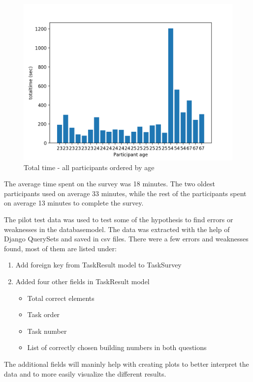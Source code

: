 \begin{figure}[h]
	\centering
	\includegraphics[width=0.8\linewidth]{fig/allParticipants_sorted_Age_Participant_exclude4_labelage}
	\caption[totaltimeage]{Total time - all participants ordered by age}
	\label{fig:allparticipantssortedageparticipantexclude4labelage}
\end{figure}

The average time spent on the survey was 18 minutes. The two oldest participants used on average 33 minutes, while the rest of the participants spent on average 13 minutes to complete the survey. 

The pilot test data was used to test some of the hypothesis to find errors or weaknesses in the databasemodel. The data was extracted with the help of Django QuerySets and saved in csv files. There were a few errors and weaknesses found, most of them are listed under: 

\begin{enumerate}
	\item Add foreign key from TaskResult model to TaskSurvey
	\item Added four other fields in TaskResult model
	\begin{itemize}
		\item Total correct elements 
		\item Task order
		\item Task number
		\item List of correctly chosen building numbers in both questions
	\end{itemize}
\end{enumerate}

The additional fields will maninly help with creating plots to better interpret the data and to more easily visualize the different results. 

